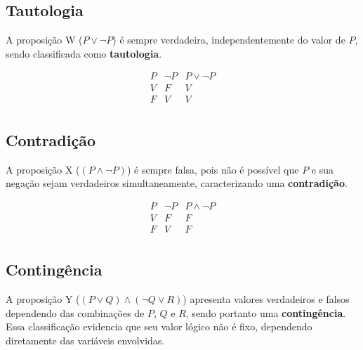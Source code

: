 \documentclass[12pt,a4paper]{article}
\begin{document}
\subsection{Tautologia}

A proposição W ($P \lor \neg P$) é sempre verdadeira, independentemente do valor de $P$, sendo classificada como \textbf{tautologia}.

\begin{table}[h]
\centering
\[
\begin{array}{c|c|c|c|c|c}
P & \neg P & P \lor \neg P \\
\hline
V & F & V \\
F & V & V \\
\end{array}
\]
\caption{Tabela verdade da expressão $P \lor \neg P$}
\end{table}

\subsection{Contradição}

A proposição X ($(P \land \neg P)$) é sempre falsa, pois não é possível que $P$ e sua negação sejam verdadeiros simultaneamente, caracterizando uma \textbf{contradição}.

\begin{table}[h]
\centering
\[
\begin{array}{c|c|c|c|c|c}
P & \neg P & P \land \neg P \\
\hline
V & F & F \\
F & V & F \\
\end{array}
\]
\caption{Tabela verdade da expressão $P \land \neg P$}
\end{table}

\subsection{Contingência}

A proposição Y ($(P \lor Q) \land (\neg Q \lor R)$) apresenta valores verdadeiros e falsos dependendo das combinações de $P$, $Q$ e $R$, sendo portanto uma \textbf{contingência}. Essa classificação evidencia que seu valor lógico não é fixo, dependendo diretamente das variáveis envolvidas.
\end{document}
